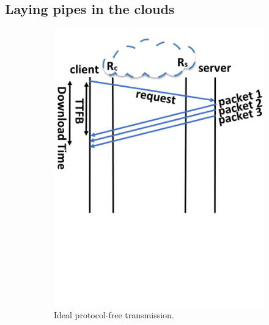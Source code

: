 \subsection{Laying pipes in the clouds}\label{sec:rate-control}

\begin{figure}[!t]
  \centering
    \begin{subfigure}{0.65\columnwidth}
  \centering
  \includegraphics[width=\columnwidth]{figures/ideal.png}
    \caption{Ideal protocol-free transmission.}
    \label{fig:ideal}
\end{subfigure}    \quad
\begin{subfigure}{0.65\columnwidth}
  \centering

\end{subfigure}
\end{figure}
